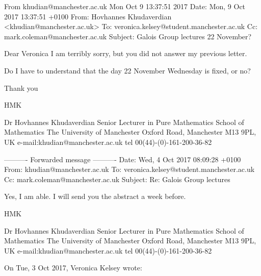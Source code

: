 From khudian@manchester.ac.uk Mon Oct  9 13:37:51 2017
Date: Mon, 9 Oct 2017 13:37:51 +0100
From: Hovhannes Khudaverdian <khudian@manchester.ac.uk>
To: veronica.kelsey@student.manchester.ac.uk
Cc: mark.coleman@manchester.ac.uk
Subject: Galois Group lectures 22 November?


            Dear Veronica
   I am terribly sorry, but
   you did not answer my previous letter.

   Do I have to understand that the day 22 November Wednesday
   is fixed, or no?

    Thank you

                     HMK


                             Dr Hovhannes Khudaverdian
                         Senior Lecturer in Pure Mathematics
                              School of Mathematics
                           The University of Manchester
                       Oxford Road, Manchester  M13 9PL, UK
                         e-mail:khudian@manchester.ac.uk
                          tel 00(44)-(0)-161-200-36-82

---------- Forwarded message ----------
Date: Wed, 4 Oct 2017 08:09:28 +0100
From: khudian@manchester.ac.uk
To: veronica.kelsey@student.manchester.ac.uk
Cc: mark.coleman@manchester.ac.uk
Subject: Re: Galois Group lectures


         Yes, I am able.
    I will send you the abstract a week before.

                   HMK

                              Dr Hovhannes Khudaverdian
                          Senior Lecturer in Pure Mathematics
                               School of Mathematics
                            The University of Manchester
                        Oxford Road, Manchester  M13 9PL, UK
                          e-mail:khudian@manchester.ac.uk
                           tel 00(44)-(0)-161-200-36-82

On Tue, 3 Oct 2017, Veronica Kelsey wrote:

